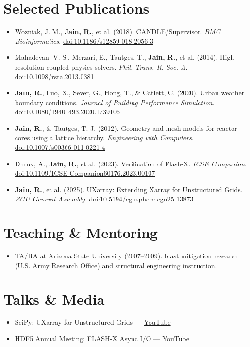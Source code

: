 \documentclass[10pt,letterpaper]{article}
\begin{document}
\section*{Selected Publications}
\begin{itemize}[leftmargin=*, itemsep=1pt]
  \item Wozniak, J. M., \textbf{Jain, R.}, et al. (2018). CANDLE/Supervisor. \textit{BMC Bioinformatics}. \href{https://doi.org/10.1186/s12859-018-2056-3}{doi:10.1186/s12859-018-2056-3}
  \item Mahadevan, V. S., Merzari, E., Tautges, T., \textbf{Jain, R.}, et al. (2014). High-resolution coupled physics solvers. \textit{Phil. Trans. R. Soc. A}. \href{https://doi.org/10.1098/rsta.2013.0381}{doi:10.1098/rsta.2013.0381}
  \item \textbf{Jain, R.}, Luo, X., Sever, G., Hong, T., \& Catlett, C. (2020). Urban weather boundary conditions. \textit{Journal of Building Performance Simulation}. \href{https://doi.org/10.1080/19401493.2020.1739106}{doi:10.1080/19401493.2020.1739106}
  \item \textbf{Jain, R.}, \& Tautges, T. J. (2012). Geometry and mesh models for reactor cores using a lattice hierarchy. \textit{Engineering with Computers}. \href{https://doi.org/10.1007/s00366-011-0221-4}{doi:10.1007/s00366-011-0221-4}
  \item Dhruv, A., \textbf{Jain, R.}, et al. (2023). Verification of Flash-X. \textit{ICSE Companion}. \href{https://doi.org/10.1109/ICSE-Companion60176.2023.00107}{doi:10.1109/ICSE-Companion60176.2023.00107}
  \item \textbf{Jain, R.}, et al. (2025). UXarray: Extending Xarray for Unstructured Grids. \textit{EGU General Assembly}. \href{https://doi.org/10.5194/egusphere-egu25-13873}{doi:10.5194/egusphere-egu25-13873}
\end{itemize}

\section*{Teaching \& Mentoring}
\begin{itemize}[leftmargin=*, itemsep=1pt]
  \item TA/RA at Arizona State University (2007--2009): blast mitigation research (U.S. Army Research Office) and structural engineering instruction.
\end{itemize}

\section*{Talks \& Media}
\begin{itemize}[leftmargin=*, itemsep=1pt]
  \item SciPy: UXarray for Unstructured Grids — \href{https://www.youtube.com/watch?v=qwqJeOO8m6A&t=545s}{YouTube}
  \item HDF5 Annual Meeting: FLASH-X Async I/O — \href{https://www.youtube.com/watch?v=MuifQ7lHRR8&t=176s}{YouTube}
\end{itemize}
\end{document}
